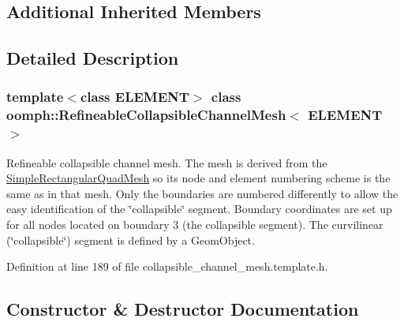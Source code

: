 \subsection*{Additional Inherited Members}


\subsection{Detailed Description}
\subsubsection*{template$<$class E\+L\+E\+M\+E\+NT$>$\newline
class oomph\+::\+Refineable\+Collapsible\+Channel\+Mesh$<$ E\+L\+E\+M\+E\+N\+T $>$}

Refineable collapsible channel mesh. The mesh is derived from the {\ttfamily \hyperlink{classoomph_1_1SimpleRectangularQuadMesh}{Simple\+Rectangular\+Quad\+Mesh}} so it\textquotesingle{}s node and element numbering scheme is the same as in that mesh. Only the boundaries are numbered differently to allow the easy identification of the \char`\"{}collapsible\char`\"{} segment. Boundary coordinates are set up for all nodes located on boundary 3 (the collapsible segment). The curvilinear (\char`\"{}collapsible\char`\"{}) segment is defined by a {\ttfamily Geom\+Object}. 

Definition at line 189 of file collapsible\+\_\+channel\+\_\+mesh.\+template.\+h.



\subsection{Constructor \& Destructor Documentation}
\mbox{\label{classoomph_1_1RefineableCollapsibleChannelMesh_a0abc3741a7b74dd543096fb303b96243}} 
